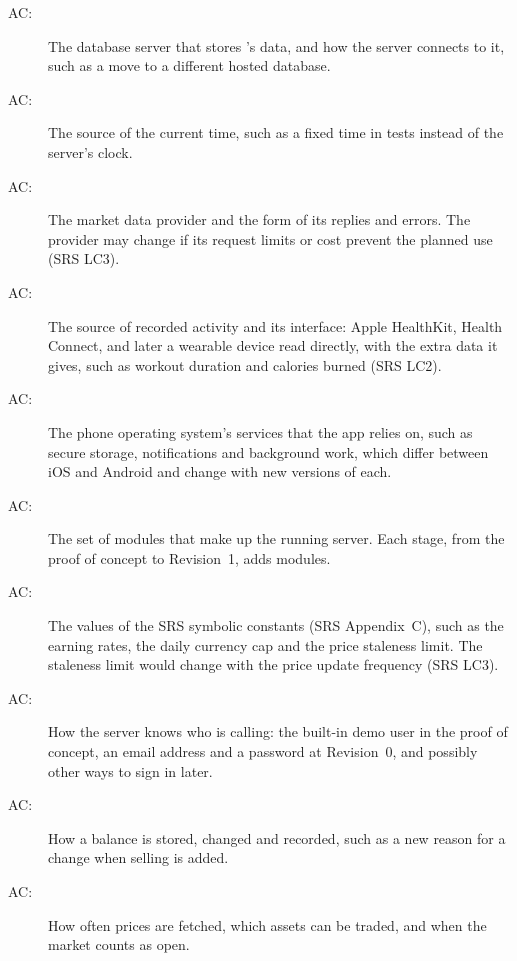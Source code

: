 \documentclass[12pt, titlepage]{article}
\newcounter{acnum}
\newcommand{\actheacnum}{AC\theacnum}
\begin{document}
\begin{description}
\item[ \actheacnum \label{acDB}:] The database server
  that stores \progname{}'s data, and how the server connects to it, such as a
  move to a different hosted database.
\item[ \actheacnum \label{acClock}:] The source of the
  current time, such as a fixed time in tests instead of the server's clock.
\item[ \actheacnum \label{acProviders}:] The market data
  provider and the form of its replies and errors. The provider may change if
  its request limits or cost prevent the planned use (SRS LC3).
\item[ \actheacnum \label{acHealth}:] The source of
  recorded activity and its interface: Apple HealthKit, Health Connect, and
  later a wearable device read directly, with the extra data it gives, such as
  workout duration and calories burned (SRS LC2).
\item[ \actheacnum \label{acDevice}:] The phone operating
  system's services that the app relies on, such as secure storage,
  notifications and background work, which differ between iOS and Android and
  change with new versions of each.
\item[ \actheacnum \label{acControl}:] The set of modules
  that make up the running server. Each stage, from the proof of concept to
  Revision~1, adds modules.
\item[ \actheacnum \label{acConstants}:] The values of
  the SRS symbolic constants (SRS Appendix~C), such as the earning rates, the
  daily currency cap and the price staleness limit. The staleness limit would
  change with the price update frequency (SRS LC3).
\item[ \actheacnum \label{acUsers}:] How the server knows
  who is calling: the built-in demo user in the proof of concept, an email
  address and a password at Revision~0, and possibly other ways to sign in
  later.
\item[ \actheacnum \label{acWallet}:] How a balance is
  stored, changed and recorded, such as a new reason for a change when selling
  is added.
\item[ \actheacnum \label{acMarket}:] How often prices
  are fetched, which assets can be traded, and when the market counts as open.

\end{description}
\end{document}
